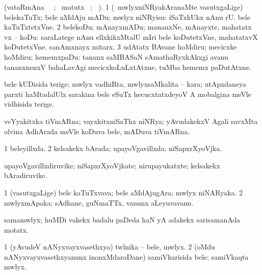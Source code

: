 \bentry 
{} 
\gl{\sakirx}(vataRmAna \parxpu\ \Eva\ ; \BU\ matutx \BUkaq\ ; \vakaq\ ). 
\bmng
\bnum
\num{1} (\kanmu\ mwlyxniNRyakAranaMte vasutxgaLige) belekaTuTx; bele aMdAju mADu; mwlyx niNRyisu:   iSaTxkUkx nAnu  rU. bele kaTuTxtetxVne. 
\num{2} belekoDu; mAnayxmADu; mananxNe, mAnayxte, mahatatx vx -- koDu:  saraLatege nAnu ellxkikxMtalU mIri bele koDutetxVne, mahatatxvX koDutetxVne.  sanAmxnayx mitarx. 
\num{3} udAtatx BAvane hoMdiru; mecicxke hoMdiru; hememxpaDu:  tananx saMBASaN sAmathaRyxkAkxgi avanu tananxnenxV bahaLavAgi mecicxkoLuLxtAtxne, tuMba hememx paDutAtxne. 
\enum
\emng
\eentry

\bentry
{}
\gl{\nA}
\expl{}
\bmng
 bele kUDisida terige; mwlyx vadhiRta, mwlyxsaMkalita -- kara; utApxdaneya parxti haMtadalUlx sarakina bele eSuTx hecucxtatxdeyoV A mobalgina meVle vidhisida terige. 
\emng
\eentry

\bentry
{}
\gl{\nA}
\expl{}
\bmng
 veYyakitxka tiVmARna; vayxkitxniSaThx niNRya; yAvudakekxV Agali savxMta olvina AdhArada meVle koDuva bele, mADuva tiVmARna. 
\emng
\eentry

\bentry
{} 
\gl{\gu}
\expl{}
\bmng
\bnum
\num{1} beleyillxda. 
\num{2} kelsakekx bArada; upayoVgavillxda; niSapxrXyoVjka. 
\enum
\emng
\eentry

\bentry
{} 
\gl{\nA}
\expl{}
\bmng
 upayoVgavillxdiruvike; niSapxrXyoVjkate; nirupayukatxte; kelsakekx bAradiruvike. 
\emng
\eentry

\bentry
{} 
\gl{\nA}
\expl{}
\bmng
\bnum
\num{1} (vasutxgaLige) bele kaTuTxvava; bele aMdAjugAra; mwlyx niNARyaka. 
\num{2} mwlyxmApaka; sAdhane, guNmaTTx, \mo vanunx aLeyuvavanu. 
\enum
\emng
\eentry

\bentry
{}
\gl{\nA}
\expl{}
\bmng
 samamwlyx; huMDi \mo vakekx badalu paDeda haN yA adakekx sarisamanAda motatx. 
\emng
\eentry

\bentry
{} 
\gl{\nA}
\expl{}
\bmng
\bnum
\num{1} (yAvudeV nANyxvayxvasethxya) twlnika -- bele, mwlyx. 
\num{2} (oMdu nANyxvayxvasethxyanunx inonxMdaroDane) samiVkarisida bele; samiVkaqta mwlyx. 
\enum
\emng
\eentry

